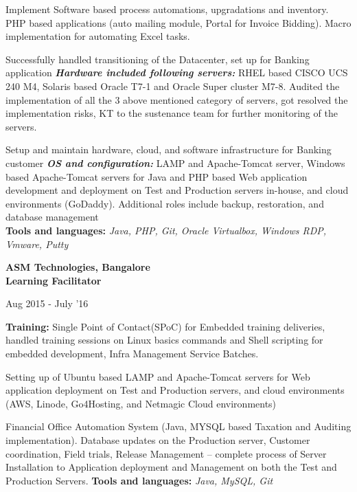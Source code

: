 \documentclass[10pt]{article}
\newenvironment{innerlist}[1][\enskip\textbullet]%
        {\begin{compactitem}[#1]}{\end{compactitem}}
\begin{document}
\vspace*{-2pt} 
\begin{innerlist} \item Implement Software based process automations, upgradations and inventory.
\subitem	PHP based applications (auto mailing module, Portal for Invoice Bidding).
\subitem    Macro implementation for automating Excel tasks.
\item	Successfully handled transitioning of the Datacenter, set up for Banking application
\subitem	\textbf{\emph{Hardware included following servers:}} RHEL based CISCO UCS 240 M4, Solaris based Oracle T7-1 and Oracle Super cluster M7-8.
\subitem	Audited the implementation of all the 3 above mentioned category of servers, got resolved the implementation risks, KT to the sustenance team for further monitoring of the servers.
\item	Setup and maintain hardware, cloud, and software infrastructure for Banking customer
\subitem	\textbf{\emph{OS and configuration:}} LAMP and Apache-Tomcat server, Windows based Apache-Tomcat servers for Java and PHP based Web application development and deployment on Test and Production servers in-house, and cloud environments (GoDaddy).
\subitem	Additional roles include backup, restoration, and database management \\
\textbf{Tools and languages:} \emph{Java, PHP, Git, Oracle Virtualbox, Windows RDP, Vmware, Putty}

\end{innerlist}  \vspace*{14pt}

\textbf{ASM Technologies, Bangalore} \\ \textbf{Learning Facilitator} \\                      
\vspace*{-32pt} \begin{flushright} {Aug 2015 - July '16} \end{flushright}

\vspace*{-2pt} 
\begin{innerlist} \item \textbf{Training:}
\subitem	Single Point of Contact(SPoC) for Embedded training deliveries, handled training sessions on Linux basics commands and Shell scripting for embedded development, Infra Management Service Batches.
\item	Setting up of Ubuntu based LAMP and Apache-Tomcat servers for Web application deployment on Test and Production servers, and cloud environments (AWS, Linode, Go4Hosting, and Netmagic Cloud environments)
\item	Financial Office Automation System (Java, MYSQL based Taxation and Auditing implementation).
\subitem	Database updates on the Production server, Customer coordination, Field trials, Release Management – complete process of Server Installation to Application deployment and Management on both the Test and Production Servers.
\textbf{Tools and languages:} \emph{Java, MySQL, Git}

\end{innerlist}  \vspace*{14pt}
\end{document}

